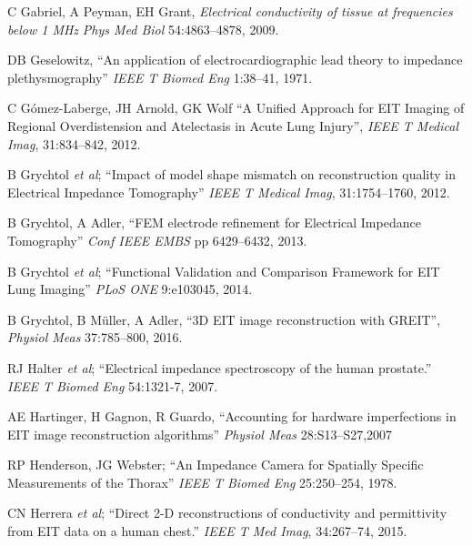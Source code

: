 \documentclass[12pt]{article} \usepackage[margin=3cm]{geometry} \usepackage[margin=20pt,font=small,labelfont=bf]{caption}\def\TBLWIDA{35mm}\def\TBLWIDB{95mm}
\newcommand{\ifmaxthree}[2]{#2 {\em et al}; }
\begin{document}
\begin{thebibliography}{00}
C Gabriel, A Peyman, EH Grant,
{\em Electrical conductivity of tissue at frequencies below 1 MHz}
{\em Phys Med Biol} 54:4863--4878, 2009.

DB Geselowitz, 
``An application of electrocardiographic lead theory to impedance
plethysmography''
{\em  IEEE T Biomed Eng} 1:38--41, 1971.

C Gómez-Laberge, JH Arnold, GK Wolf
``A Unified Approach for EIT Imaging of Regional Overdistension and Atelectasis
in Acute Lung Injury'',
{\em IEEE T Medical Imag}, 31:834--842, 2012.

\ifmaxthree{
B Grychtol, WRB Lionheart, M Bodenstein, GK Wolf, A Adler
}{
B Grychtol
}
``Impact of model shape mismatch on reconstruction quality in Electrical Impedance Tomography''
{\em IEEE T Medical Imag}, 31:1754--1760, 2012.

B Grychtol, A Adler,
``FEM electrode refinement for Electrical Impedance Tomography''
{\em Conf IEEE EMBS} pp 6429--6432, 2013. %

\ifmaxthree{
B Grychtol, G Elke, P Meybohm, N Weiler, I Frerichs, A Adler,
}{
B Grychtol
}
``Functional Validation and Comparison Framework for EIT Lung Imaging''
{\em PLoS ONE} 9:e103045, 2014.

B Grychtol, B Müller, A Adler,
``3D EIT image reconstruction with GREIT'',
{\em Physiol Meas} 37:785--800, 2016.

\ifmaxthree{
RJ Halter, A Hartov, JA Heaney, KD Paulsen, AR Schned
}{
RJ Halter
}
``Electrical impedance spectroscopy of the human prostate.''
{\em IEEE T Biomed Eng} 54:1321-7, 2007. %

AE Hartinger, H Gagnon, R Guardo,
``Accounting for hardware imperfections in EIT image reconstruction algorithms''
{\em  Physiol Meas} 28:S13--S27,2007

RP Henderson, JG Webster;
``An Impedance Camera for Spatially Specific Measurements of the Thorax''
{\em IEEE T Biomed Eng} 25:250--254, 1978.

\ifmaxthree{
CN Herrera, MF Vallejo, JL Mueller, RG Lima;
}{
CN Herrera
}
``Direct 2-D reconstructions of conductivity and permittivity from EIT data on a human chest.''
{\em IEEE T Med Imag}, 34:267--74, 2015.


\end{thebibliography}
\end{document}
